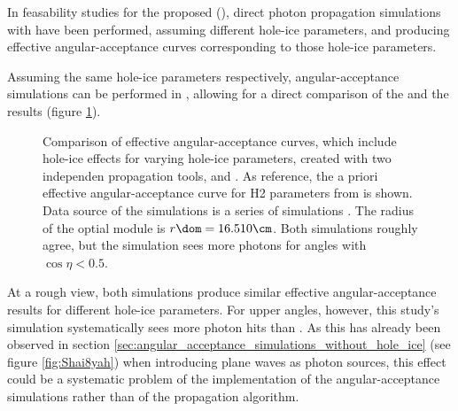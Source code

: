 In feasability studies for the proposed  (), direct photon propagation simulations with \ppc have been performed, assuming different hole-ice parameters, and producing effective angular-acceptance curves corresponding to those hole-ice parameters. \cite{pocam}\cite{icrc17pocam}

Assuming the same hole-ice parameters respectively, angular-acceptance simulations can be performed in \clsim, allowing for a direct comparison of the \ppc and the \clsim results (figure \ref{fig:Ou7fux1o}).


\begin{figure}[htbp]
  \hfill
  \hfill
  \hfill
  \hfill
  \caption{Comparison of effective angular-acceptance curves, which include hole-ice effects for varying hole-ice parameters, created with two independen propagation tools, \ppc and \clsim. As reference, the a priori effective angular-acceptance curve for H2 parameters from \cite{icepaper} is shown. Data source of the \ppc simulations is a series of  simulations \cite{icrc17pocam}. The radius of the optial module is $r\dom = 16.510\cm$. Both simulations roughly agree, but the \clsim simulation sees more photons for angles with $\cos \eta < 0.5$.}
  \label{fig:Ou7fux1o}
\end{figure}

At a rough view, both simulations produce similar effective angular-acceptance results for different hole-ice parameters. For upper angles, however, this study's simulation systematically sees more photon hits than \ppc. As this has already been observed in section \ref{sec:angular_acceptance_simulations_without_hole_ice} (see figure \ref{fig:Shai8yah}) when introducing plane waves as photon sources, this effect could be a systematic problem of the implementation of the angular-acceptance simulations rather than of the propagation algorithm.

